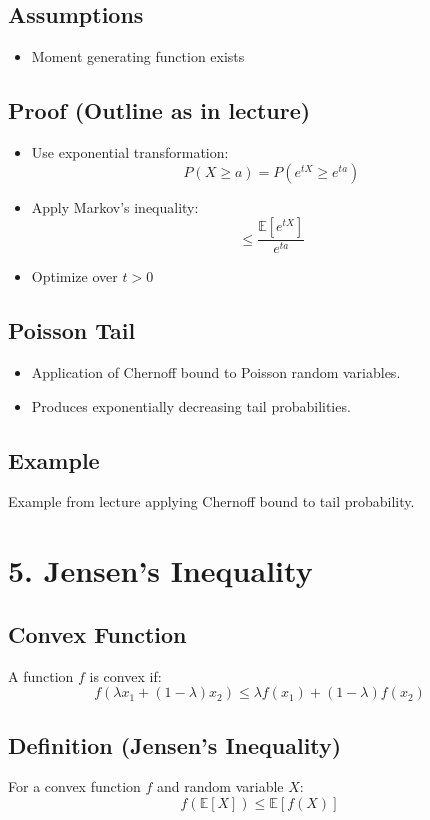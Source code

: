 \documentclass[12pt]{article}
\begin{document}
\subsection*{Assumptions}
\begin{itemize}
    \item Moment generating function exists
\end{itemize}

\subsection*{Proof (Outline as in lecture)}
\begin{itemize}
    \item Use exponential transformation:
    \[
    P(X \geq a) = P(e^{tX} \geq e^{ta})
    \]
    \item Apply Markov's inequality:
    \[
    \leq \frac{\mathbb{E}[e^{tX}]}{e^{ta}}
    \]
    \item Optimize over $t > 0$
\end{itemize}

\subsection*{Poisson Tail}
\begin{itemize}
    \item Application of Chernoff bound to Poisson random variables.
    \item Produces exponentially decreasing tail probabilities.
\end{itemize}

\subsection*{Example}
Example from lecture applying Chernoff bound to tail probability.

\section*{5. Jensen's Inequality}

\subsection*{Convex Function}
A function $f$ is convex if:
\[
f(\lambda x_1 + (1 - \lambda)x_2) \leq \lambda f(x_1) + (1 - \lambda)f(x_2)
\]

\subsection*{Definition (Jensen's Inequality)}
For a convex function $f$ and random variable $X$:
\[
f(\mathbb{E}[X]) \leq \mathbb{E}[f(X)]
\]
\end{document}
